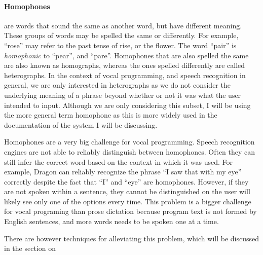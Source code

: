 \documentclass[../thesis.tex]{subfiles}
\begin{document}

\paragraph{Homophones}
are words that sound the same as another word, but have different meaning.
These groups of words may be spelled the same or differently.
For example, ``rose'' may refer to the past tense of rise, or the flower.
The word ``pair'' is \textit{homophonic} to ``pear'', and ``pare''.
Homophones that are also spelled the same are also known as homographs, whereas the ones spelled differently are called heterographs.
In the context of vocal programming, and speech recognition in general, we are only interested in heterographs as we do not consider
the underlying meaning of a phrase beyond whether or not it was what the user intended to input.
Although we are only considering this subset, I will be using the more general term homophone as this is more widely used in the documentation
of the system I will be discussing.

Homophones are a very big challenge for vocal programming.
Speech recognition engines are not able to reliably distinguish between homophones.
Often they can still infer the correct word based on the context in which it was used.
For example, Dragon can reliably recognize the phrase ``I saw that with my eye'' correctly despite the fact that ``I'' and ``eye'' are homophones.
However, if they are not spoken within a sentence, they cannot be distinguished on the user will likely see only one of the options every time.
This problem is a bigger challenge for vocal programing than prose dictation because program text is not formed by English sentences, and more words needs to be
spoken one at a time.

There are however techniques for alleviating this problem, which will be discussed in the section on~
\end{document}
